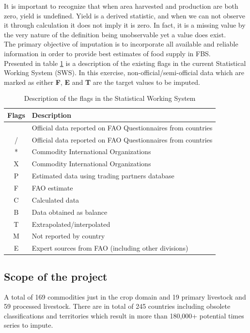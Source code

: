 \documentclass[nojss]{jss}\usepackage[]{graphicx}\usepackage[]{color}
\begin{document}
It is important to recognize that when area harvested and production
are both zero, yield is undefined. Yield is a derived statistic, and
when we can not observe it through calculation it does not imply it is
zero. In fact, it is a missing value by the very nature of the
definition being unobservable yet a value does exist.\\

The primary objective of imputation is to incorporate all
available and reliable information in order to provide best estimates of
food supply in FBS.\\

Presented in table \ref{tab:swsflag} is a description of the existing
flags in the current Statistical Working System (SWS). In this
exercise, non-official/semi-official data which are marked as either
\textbf{F}, \textbf{E} and \textbf{T} are the target values to be
imputed.\\

\begin{table}[h!]
  \label{tab:swsflag}
  \caption{Description of the flags in the Statistical Working System}
  \begin{center}
    \begin{tabular}{|c||p{12cm}|}
      \hline
      Flags & Description\\
      \hline
      & Official data reported on FAO Questionnaires from countries\\
      / & Official data reported on FAO Questionnaires from countries\\
      * & Commodity International Organizations\\
      X & Commodity International Organizations\\
      P & Estimated data using trading partners database\\
      F & FAO estimate\\
      C & Calculated data\\
      B & Data obtained as balance\\
      T & Extrapolated/interpolated\\
      M & Not reported by country\\
      E & Expert sources from FAO (including other divisions)\\
      \hline
    \end{tabular}
  \end{center}  
\end{table}

\subsection{Scope of the project}
A total of 169 commodities just in the crop domain and 19 primary
livestock and 59 processed livestock. There are in total of 245
countries including obsolete classifications and territories which
result in more than 180,000+ potential times series to impute.\\
\end{document}
